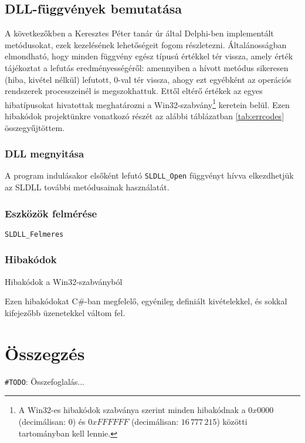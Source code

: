 \documentclass[tocnopagenum]{thesis-ekf}
\newtheorem{tetel}{Tétel}[chapter]
\theoremstyle{definition}
\newtheorem{definicio}[tetel]{Definíció}
\theoremstyle{remark}
\newtheorem{megjegyzes}[tetel]{Megjegyzés}
\begin{document}
	\section{DLL-függvények bemutatása}
	A következőkben a Keresztes Péter tanár úr által Delphi-ben implementált metódusokat, ezek kezelésének lehetőségeit fogom részletezni.
	Általánosságban elmondható, hogy minden függvény egész típusú értékkel tér vissza, amely érték tájékoztat a lefutás eredményességéről: amennyiben a hívott metódus sikeresen (hiba, kivétel nélkül) lefutott, 0-val tér vissza, ahogy ezt egyébként az operációs rendszerek processzeinél is megszokhattuk. Ettől eltérő értékek az egyes hibatípusokat hivatottak meghatározni a Win32-szabvány\footnote{A Win32-es hibakódok szabványa szerint minden hibakódnak a $0x0000$ (decimálisan: 0) és $0xFFFFFF$ (decimálisan: $16\,777\,215$) közötti tartományban kell lennie.} keretein belül. Ezen hibakódok projektünkre vonatkozó részét az alábbi táblázatban \ref{tab:errcodes} összegyűjtöttem.
	\subsection{DLL megnyitása}
	A program indulásakor elsőként lefutó \verb*|SLDLL_Open| függvényt hívva elkezdhetjük az SLDLL további metódusainak használatát.
	\subsection{Eszközök felmérése}
	\verb*|SLDLL_Felmeres|
	\subsection{Hibakódok}
	\begin{table}[h!]
		
		\caption{Hibakódok a Win32-szabványból}
		\label{tab:errcodes}
	\end{table}
	
	
	
	
	\cite{errcodes}
	Ezen hibakódokat C\#-ban megfelelő, egyénileg definiált kivételekkel, és sokkal kifejezőbb üzenetekkel váltom fel. 
	\begin{comment}
		Ezek később lesznek hasznosak
		\begin{tetel}
			Tétel szövege.
		\end{tetel}
		
		\begin{proof}
			Bizonyítás szövege.
		\end{proof}
		
		\begin{definicio}
			Definíció szövege.
		\end{definicio}
		
		\begin{megjegyzes}
			Megjegyzés szövege.
		\end{megjegyzes}
	\end{comment}
	
	\chapter*{Összegzés}
	\verb*|#TODO|: Összefoglalás...
	
	
	
\end{document}
